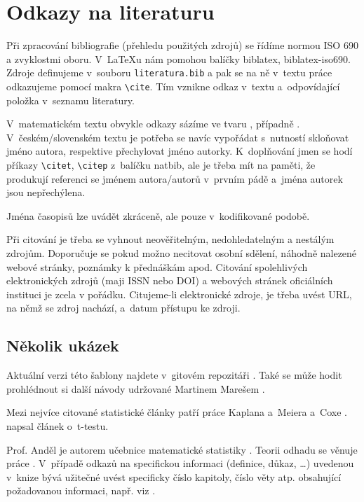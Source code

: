 
\chapter{Odkazy na literaturu}

Při zpracování bibliografie (přehledu použitých zdrojů) se řídíme
normou ISO 690 a zvyklostmi oboru. V~\LaTeX{}u nám pomohou balíčky
\textsf{biblatex}, \textsf{biblatex-iso690}.
Zdroje definujeme v~souboru \texttt{literatura.bib} a pak se na ně v~textu
práce odkazujeme pomocí makra \verb|\cite|. Tím vznikne odkaz v~textu
a~odpovídající položka v~seznamu literatury.

V~matematickém textu obvykle odkazy sázíme ve tvaru
, případně
.
V~českém/slovenském textu je potřeba se navíc vypořádat
s~nutností skloňovat jméno autora, respektive přechylovat jméno
autorky.
K~doplňování jmen se hodí příkazy \verb|\citet|, \verb|\citep|
z~balíčku \textsf{natbib}, ale je třeba mít na paměti, že
produkují referenci se jménem autora/autorů v~prvním pádě a~jména
autorek jsou nepřechýlena.

Jména časopisů lze uvádět zkráceně, ale pouze v~kodifikované podobě.

Při citování je třeba se vyhnout neověřitelným, nedohledatelným a nestálým zdrojům.
Doporučuje se pokud možno necitovat osobní sdělení, náhodně nalezené webové stránky,
poznámky k přednáškám apod. Citování spolehlivých elektronických zdrojů (maji ISSN
nebo DOI) a webových stránek oficiálních instituci je zcela v pořádku. Citujeme-li
elektronické zdroje, je třeba uvést URL, na němž se zdroj nachází, a~datum přístupu
ke zdroji.

\section{Několik ukázek}

Aktuální verzi této šablony najdete v~gitovém repozitáři \cite{ThesisTemplate}.
Také se může hodit prohlédnout si další návody udržované Martinem Marešem
\cite{ThesisWeb}.

Mezi nejvíce citované statistické články patří práce Kaplana a~Meiera a~Coxe
\cite{KaplanMeier58, Cox72}. \citet{Student08} napsal článek o~t-testu.

Prof. Anděl je autorem učebnice matematické statistiky \cite{Andel98}.
Teorii odhadu se věnuje práce \citet{LehmannCasella98}.
V~případě odkazů na specifickou informaci
(definice, důkaz, \dots) uvedenou v~knize bývá užitečné uvést
specificky číslo kapitoly, číslo věty atp. obsahující požadovanou
informaci, např. viz \citet[Věta 4.22]{Andel07}.

